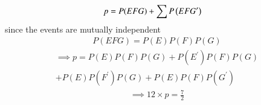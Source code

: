 \begin{align}
    p &=P(EFG)+{\sum P\left(EFG^{\prime}\right)} 
\end{align}
since the events are mutually independent
\begin{align}
    P(EFG) = P(E)P(F)P(G)
\end{align}
\begin{multline}
\implies p=P(E)P(F)P(G)+P(E^{\prime})P(F)P(G)\\
+P(E)P(F^{\prime})P(G)+P(E)P(F)P(G^{\prime})
\end{multline}
\begin{align}
  \implies 12\times p =\frac{7}{2}
\end{align}